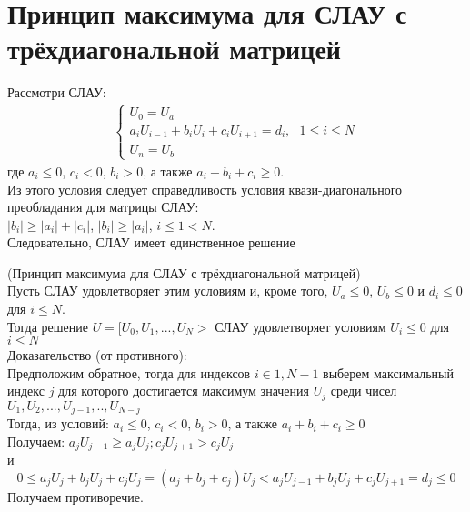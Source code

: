 \documentclass[__main__.tex]{subfiles}
\begin{document}
\section{Принцип максимума для СЛАУ с трёхдиагональной матрицей}
Рассмотри СЛАУ:
\begin{align*}
\begin{cases}
U_0 = U_a \\
a_iU_{i-1} + b_iU_i + c_iU_{i+1} = d_i , \ \ \ 1 \leq i \leq N \\
U_n = U_b
\end{cases}
\end{align*}
где $a_i \leq 0$, $c_i < 0$, $b_i > 0$, а также $a_i+b_i+c_i \geq 0$. \\
Из этого условия следует справедливость условия квази-диагонального преобладания для матрицы СЛАУ: \\
$|b_i| \geq |a_i|+|c_i| $, $|b_i|\geq|a_i|$, $i \leq 1 < N$.\\
Следовательно, СЛАУ имеет единственное решение
\begin{theorem}(Принцип максимума для СЛАУ с трёхдиагональной матрицей)\\
Пусть СЛАУ удовлетворяет этим условиям и, кроме того, $U_a \leq 0$, $U_b \leq 0$ и $d_i \leq 0$ для $ i \leq N$.\\
Тогда решение $U = [U_0,U_1,...,U_N>$ СЛАУ удовлетворяет условиям $U_i \leq 0$ для $ i \leq N$ \\
Доказательство (от противного): \\
Предположим обратное, тогда для индексов $i \in 1,N-1$ выберем максимальный индекс $j$ для которого достигается максимум значения $U_j$ 
среди чисел $U_1,U_2,...,U_{j-1},..,U_{N-j}$\\
Тогда, из условий:
$a_i \leq 0$, $c_i < 0$, $b_i > 0$, а также $a_i+b_i+c_i \geq 0$ \\
Получаем:
$ a_jU_{j-1} \geq a_j U_j ; c_jU_{j+1} > c_jU_j$\\
и
$$ 0 \leq a_jU_j+b_jU_j+c_jU_j = (a_j+b_j+c_j)U_j < a_jU_{j-1} + b_j U_j + c_j U_{j+1} = d_j \leq 0$$
Получаем противоречие.
\end{theorem}
\end{document}
